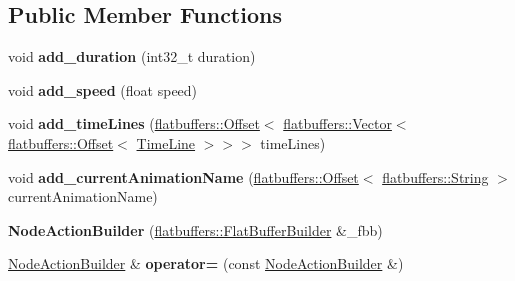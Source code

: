 \subsection*{Public Member Functions}
\begin{DoxyCompactItemize}
\item 
\mbox{\label{structflatbuffers_1_1NodeActionBuilder_af724c6df26fd607066831a7feefb3fdf}} 
void {\bfseries add\+\_\+duration} (int32\+\_\+t duration)
\item 
\mbox{\label{structflatbuffers_1_1NodeActionBuilder_a37b56801b06d9cd3174ad3be6d860490}} 
void {\bfseries add\+\_\+speed} (float speed)
\item 
\mbox{\label{structflatbuffers_1_1NodeActionBuilder_ada180e2edfd2a067007804f6c56688a9}} 
void {\bfseries add\+\_\+time\+Lines} (\hyperlink{structflatbuffers_1_1Offset}{flatbuffers\+::\+Offset}$<$ \hyperlink{classflatbuffers_1_1Vector}{flatbuffers\+::\+Vector}$<$ \hyperlink{structflatbuffers_1_1Offset}{flatbuffers\+::\+Offset}$<$ \hyperlink{structflatbuffers_1_1TimeLine}{Time\+Line} $>$$>$$>$ time\+Lines)
\item 
\mbox{\label{structflatbuffers_1_1NodeActionBuilder_a2f41fd9a4334b4220ac490b7fdfad1f9}} 
void {\bfseries add\+\_\+current\+Animation\+Name} (\hyperlink{structflatbuffers_1_1Offset}{flatbuffers\+::\+Offset}$<$ \hyperlink{structflatbuffers_1_1String}{flatbuffers\+::\+String} $>$ current\+Animation\+Name)
\item 
\mbox{\label{structflatbuffers_1_1NodeActionBuilder_a68f8c516007734c2689d13c82fe80f02}} 
{\bfseries Node\+Action\+Builder} (\hyperlink{classflatbuffers_1_1FlatBufferBuilder}{flatbuffers\+::\+Flat\+Buffer\+Builder} \&\+\_\+fbb)
\item 
\mbox{\label{structflatbuffers_1_1NodeActionBuilder_a889e4b928bbc6e5017a9842d18912fac}} 
\hyperlink{structflatbuffers_1_1NodeActionBuilder}{Node\+Action\+Builder} \& {\bfseries operator=} (const \hyperlink{structflatbuffers_1_1NodeActionBuilder}{Node\+Action\+Builder} \&)
\item 

\end{DoxyCompactItemize}
